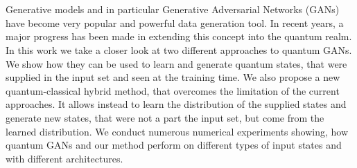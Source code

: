 \chapter{\abstractname}

Generative models and in particular Generative Adversarial Networks (GANs) have
become very popular and powerful data generation tool. In recent years, a major
progress has been made in extending this concept into the quantum realm. In this
work we take a closer look at two different approaches to quantum GANs. We show how they can
be used to learn and generate quantum states, that were supplied in the 
input set and seen at the training time. We also propose a
new quantum-classical hybrid method, that overcomes the limitation of
the current approaches. It allows instead to learn the distribution of the supplied
states and generate new states, that were not a part the input set, but come
from the learned distribution. We
conduct numerous numerical experiments showing, how quantum 
GANs and our method perform on different types of input states and with different
architectures. 






%
%
%
%
%
